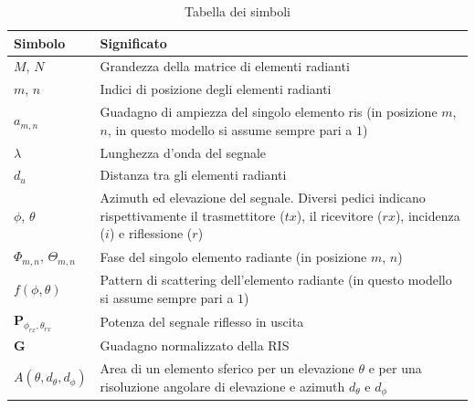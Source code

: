 \begin{table}[!ht]
  \centering
  \begin{tabular}{p{}p{}}
    \hline
    \textbf{Simbolo}                     & \textbf{Significato}                                                                                                                                          \\
    \hline
    $M$, $N$                             & Grandezza della matrice di elementi radianti                                                                                                                  \\
    $m$, $n$                             & Indici di posizione degli elementi radianti                                                                                                                   \\
    $a_{m,n}$                            & Guadagno di ampiezza del singolo elemento ris (in posizione $m$, $n$, in questo modello si assume sempre pari a $1$)                                          \\
    $\lambda$                            & Lunghezza d'onda del segnale                                                                                                                                  \\
    $d_{u}$                              & Distanza tra gli elementi radianti                                                                                                                            \\
    $\phi$, $\theta$                     & Azimuth ed elevazione del segnale. Diversi pedici indicano rispettivamente il trasmettitore ($tx$), il ricevitore ($rx$), incidenza ($i$) e riflessione ($r$) \\
    $\Phi_{m,n}$, $\Theta_{m,n}$         & Fase del singolo elemento radiante (in posizione $m$, $n$)                                                                                                    \\
    $f(\phi, \theta)$                    & Pattern di scattering dell'elemento radiante (in questo modello si assume sempre pari a $1$)                                                                  \\
    $\textbf{P}_{\phi_{rx},\theta_{rx}}$ & Potenza del segnale riflesso in uscita                                                                                                                        \\
    $\textbf{G}$                         & Guadagno normalizzato della RIS                                                                                                                               \\
    $A(\theta, d_{\theta}, d_{\phi})$    & Area di un elemento sferico per un elevazione $\theta$ e per una risoluzione angolare di elevazione e azimuth $d_{\theta}$ e $d_{\phi}$                       \\
    \hline
  \end{tabular}
  \caption{Tabella dei simboli}
  \label{tab:symbols}
\end{table}

